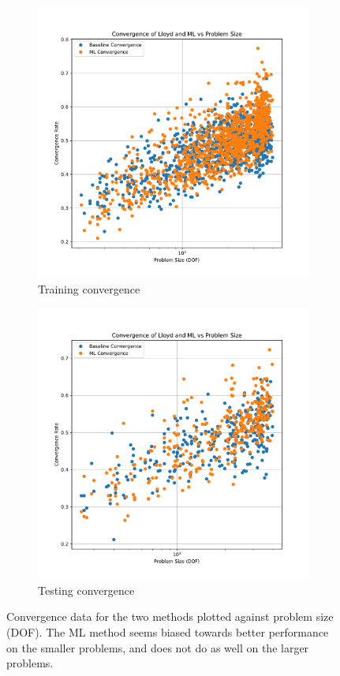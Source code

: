 \documentclass{article}
\begin{document}
\begin{figure}[h]
  \centering
  \begin{subfigure}[t]{0.49\textwidth}
    \centering
    \includegraphics[width=\textwidth]{train_convergence_per_size.pdf}
    \caption{Training convergence}
  \end{subfigure}
  \begin{subfigure}[t]{0.49\textwidth}
    \centering
    \includegraphics[width=\textwidth]{test_convergence_per_size.pdf}
    \caption{Testing convergence}
  \end{subfigure}
  \caption{Convergence data for the two methods plotted against problem size (DOF).  The ML method seems biased towards better performance on the smaller problems, and does not do as well on the larger problems.}
  \label{fig:conv_per_size}
\end{figure}
\end{document}
